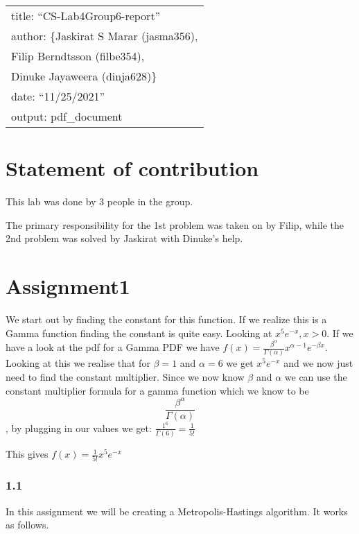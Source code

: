 \documentclass[
]{article}
\author{}
\date{\vspace{-2.5em}}
\begin{document}
\begin{longtable}[]{@{}l@{}}
\toprule
\endhead
title: ``CS-Lab4Group6-report'' \\
author: \{Jaskirat S Marar (jasma356), \\
Filip Berndtsson (filbe354), \\
Dinuke Jayaweera (dinja628)\} \\
date: ``11/25/2021'' \\
output: pdf\_document \\
\bottomrule
\end{longtable}

\hypertarget{statement-of-contribution}{%
\section{Statement of contribution}\label{statement-of-contribution}}

This lab was done by 3 people in the group.

The primary responsibility for the 1st problem was taken on by Filip,
while the 2nd problem was solved by Jaskirat with Dinuke's help.

\hypertarget{assignment1}{%
\section{Assignment1}\label{assignment1}}

We start out by finding the constant for this function. If we realize
this is a Gamma function finding the constant is quite easy. Looking at
\(x^5e^{-x}, x>0\). If we have a look at the pdf for a Gamma PDF we have
\(f(x) = \frac{\beta^{\alpha}}{\Gamma(\alpha)}x^{\alpha-1}e^{-\beta x}\).
Looking at this we realise that for \(\beta = 1\) and \(\alpha=6\) we
get \(x^5e^{-x}\) and we now just need to find the constant multiplier.
Since we now know \(\beta\) and \(\alpha\) we can use the constant
multiplier formula for a gamma function which we know to be
\[\frac{\beta^{\alpha}}{\Gamma(\alpha)}\] , by plugging in our values we
get: \(\frac{1^{6}}{\Gamma(6)}= \frac{1}{5!}\)

This gives \(f(x)=\frac{1}{5!} x^5e^{-x}\)

\hypertarget{section}{%
\subsubsection{1.1}\label{section}}

In this assignment we will be creating a Metropolis-Hastings algorithm.
It works as follows.
\end{document}
